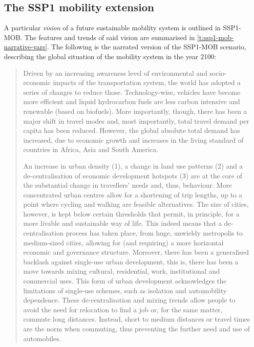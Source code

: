 \subsection{The SSP1 mobility extension}
\label{ss:results:ssp1-mob-development}
A particular \textit{vision} of a future sustainable mobility system is outlined in SSP1-MOB. The features and trends of said vision are summarised in \autoref{t:ssp1-mob-narrative-vars}. The following is the narrated version of the SSP1-MOB scenario, describing the global situation of the mobility system in the year 2100:

\blockquote{Driven by an increasing awareness level of environmental and socio-economic impacts of the transportation system, the world has adopted a series of changes to reduce those. Technology-wise, vehicles have become more efficient and liquid hydrocarbon fuels are less carbon intensive and renewable (based on biofuels). More importantly, though, there has been a major shift in travel modes and, most importantly, total travel demand per capita has been reduced. However, the global absolute total demand has increased, due to economic growth and increases in the living standard of countries in Africa, Asia and South America.

An increase in urban density (1), a change in land use patterns (2) and a de-centralisation of economic development hotspots (3) are at the core of the substantial change in travellers' needs and, thus, behaviour. More concentrated urban centres allow for a shortening of trip lengths, up to a point where cycling and walking are feasible alternatives. The size of cities, however, is kept below certain thresholds that permit, in principle, for a more livable and sustainable way of life. This indeed means that a de-centralisation process has taken place, from huge, unwieldy metropolis to medium-sized cities, allowing for (and requiring) a more horizontal economic and governance structure. Moreover, there has been a generalised backlash against single-use urban development, this is, there has been a move towards mixing cultural, residential, work, institutional and commercial uses. This form of urban development acknowledges the limitations of single-use schemes, such as isolation and automobility dependence. These de-centralisation and mixing trends allow people to avoid the need for relocation to find a job or, for the same matter, commute long distances. Instead, short to medium distances or travel times are the norm when commuting, thus preventing the further need and use of automobiles.

}
